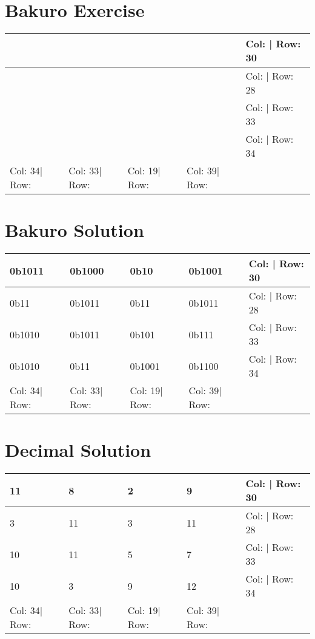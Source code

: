 \documentclass[]{article}
\begin{document}
            \section{Bakuro Exercise}\begin{tabular}{|l||l||l||l||l|}
\hline
               &               &               &               & Col: | Row: 30 \\ \hline
               &               &               &               & Col: | Row: 28 \\ \hline
               &               &               &               & Col: | Row: 33 \\ \hline
               &               &               &               & Col: | Row: 34 \\ \hline
 Col: 34| Row: & Col: 33| Row: & Col: 19| Row: & Col: 39| Row: &                \\ \hline
\hline
\end{tabular}\newpage 
 \section{Bakuro Solution} 
\begin{tabular}{|l||l||l||l||l|}
\hline
 0b1011        & 0b1000        & 0b10          & 0b1001        & Col: | Row: 30 \\ \hline
 0b11          & 0b1011        & 0b11          & 0b1011        & Col: | Row: 28 \\ \hline
 0b1010        & 0b1011        & 0b101         & 0b111         & Col: | Row: 33 \\ \hline
 0b1010        & 0b11          & 0b1001        & 0b1100        & Col: | Row: 34 \\ \hline
 Col: 34| Row: & Col: 33| Row: & Col: 19| Row: & Col: 39| Row: &                \\ \hline
\hline
\end{tabular}\newpage 
 \section{Decimal Solution} 
\begin{tabular}{|l||l||l||l||l|}
\hline
 11            & 8             & 2             & 9             & Col: | Row: 30 \\ \hline
 3             & 11            & 3             & 11            & Col: | Row: 28 \\ \hline
 10            & 11            & 5             & 7             & Col: | Row: 33 \\ \hline
 10            & 3             & 9             & 12            & Col: | Row: 34 \\ \hline
 Col: 34| Row: & Col: 33| Row: & Col: 19| Row: & Col: 39| Row: &                \\ \hline
\hline
\end{tabular}
 
\end{document}
